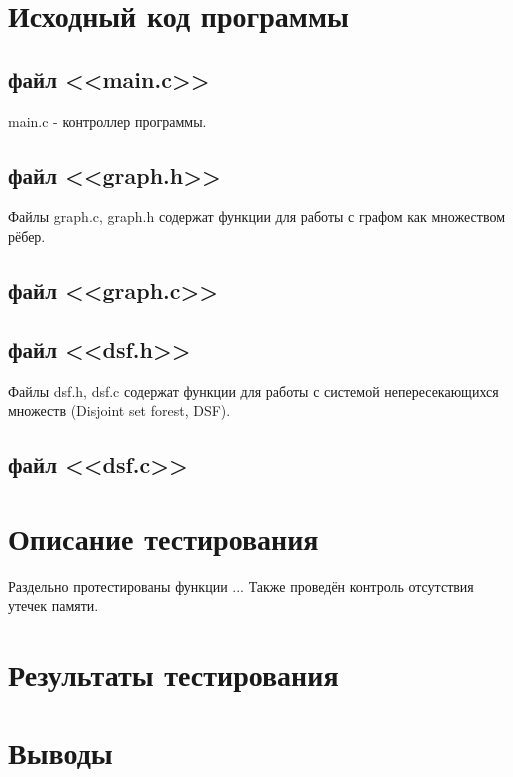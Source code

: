 \documentclass[a4paper,12pt]{article} %
\begin{document}

\setcounter{page}{2}
\tableofcontents
\newpage

\newpage
\section{Исходный код программы}
\subsection{файл <<main.c>>}
main.c - контроллер программы.

\subsection{файл <<graph.h>>}
Файлы graph.c, graph.h содержат функции для работы с графом как множеством рёбер.

\subsection{файл <<graph.c>>}

\subsection{файл <<dsf.h>>}
Файлы dsf.h, dsf.c содержат функции для работы с системой непересекающихся множеств (Disjoint set forest, DSF).

\newpage
\subsection{файл <<dsf.c>>}

\section{Описание тестирования}
Раздельно протестированы функции ... Также проведён контроль отсутствия утечек памяти.
\section{Результаты тестирования}
\section{Выводы}
%
\begin{thebibliography}{100}
\end{thebibliography}
\end{document}
